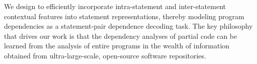 We design {\tool} to efficiently incorporate intra-statement and
inter-statement contextual features into statement representations,
thereby modeling program dependencies as a statement-pair dependence
decoding task. The key philosophy that drives our work is that the
dependency analyses of partial code can be learned from the analysis
of entire programs in the wealth of information obtained from
ultra-large-scale, open-source software repositories.


